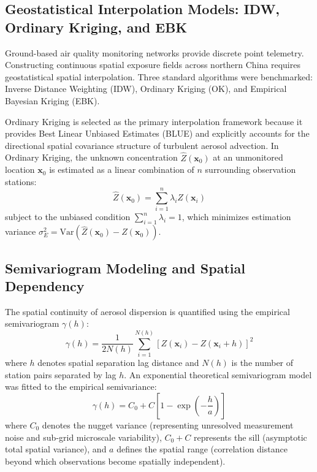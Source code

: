 \subsection{Geostatistical Interpolation Models: IDW, Ordinary Kriging, and EBK}
\label{subsec:kriging_models}

Ground-based air quality monitoring networks provide discrete point telemetry. Constructing continuous spatial exposure fields across northern China requires geostatistical spatial interpolation. Three standard algorithms were benchmarked: Inverse Distance Weighting (IDW), Ordinary Kriging (OK), and Empirical Bayesian Kriging (EBK).

Ordinary Kriging is selected as the primary interpolation framework because it provides Best Linear Unbiased Estimates (BLUE) and explicitly accounts for the directional spatial covariance structure of turbulent aerosol advection. In Ordinary Kriging, the unknown concentration $\hat{Z}(\mathbf{x}_0)$ at an unmonitored location $\mathbf{x}_0$ is estimated as a linear combination of $n$ surrounding observation stations:
\begin{equation}
\label{eq:kriging_estimator}
\hat{Z}(\mathbf{x}_0) = \sum_{i=1}^n \lambda_i Z(\mathbf{x}_i)
\end{equation}
subject to the unbiased condition $\sum_{i=1}^n \lambda_i = 1$, which minimizes estimation variance $\sigma_E^2 = \text{Var}\left(\hat{Z}(\mathbf{x}_0) - Z(\mathbf{x}_0)\right)$.

\subsection{Semivariogram Modeling and Spatial Dependency}
\label{subsec:semivariogram}

The spatial continuity of aerosol dispersion is quantified using the empirical semivariogram $\gamma(h)$:
\begin{equation}
\label{eq:semivariogram_ch5}
\gamma(h) = \frac{1}{2 N(h)} \sum_{i=1}^{N(h)} \left[ Z(\mathbf{x}_i) - Z(\mathbf{x}_i + h) \right]^2
\end{equation}
where $h$ denotes spatial separation lag distance and $N(h)$ is the number of station pairs separated by lag $h$. An exponential theoretical semivariogram model was fitted to the empirical semivariance:
\begin{equation}
\label{eq:exponential_semivariogram}
\gamma(h) = C_0 + C \left[ 1 - \exp\left(-\frac{h}{a}\right) \right]
\end{equation}
where $C_0$ denotes the nugget variance (representing unresolved measurement noise and sub-grid microscale variability), $C_0 + C$ represents the sill (asymptotic total spatial variance), and $a$ defines the spatial range (correlation distance beyond which observations become spatially independent).

